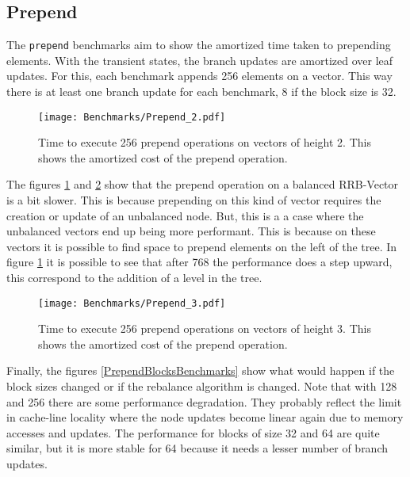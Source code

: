 \FloatBarrier

\subsection{Prepend}
The \texttt{prepend} benchmarks aim to show the amortized time taken to prepending elements. With the transient states, the branch updates are amortized over leaf updates. For this, each benchmark appends 256 elements on a vector. This way there is at least one branch update for each benchmark, 8 if the block size is 32.


\begin{figure}[h!]
  \centering
  \texttt{[image: Benchmarks/Prepend\_2.pdf]}
  \caption{Time to execute 256 prepend operations on vectors of height 2. This shows the amortized cost of the prepend operation.}
  \label{Prepend2Benchmarks}
\end{figure}

The figures \ref{Prepend2Benchmarks} and \ref{Prepend3Benchmarks} show that the prepend operation on a balanced RRB-Vector is a bit slower. This is because prepending on this kind of vector requires the creation or update of an unbalanced node. But, this is a a case where the unbalanced vectors end up being more performant. This is because on these vectors it is possible to find space to prepend elements on the left of the tree. In figure \ref{Prepend2Benchmarks} it is possible to see that after 768 the performance does a step upward, this correspond to the addition of a level in the tree.

\begin{figure}[h!]
  \centering
  \texttt{[image: Benchmarks/Prepend\_3.pdf]}
  \caption{Time to execute 256 prepend operations on vectors of height 3. This shows the amortized cost of the prepend operation.}
  \label{Prepend3Benchmarks}
\end{figure}

\FloatBarrier

Finally, the figures \ref{PrependBlocksBenchmarks} show what would happen if the block sizes changed or if the rebalance algorithm is changed. Note that with 128 and 256 there are some performance degradation. They probably reflect the limit in cache-line locality where the node updates become linear again due to memory accesses and updates. The performance for blocks of size 32 and 64 are quite similar, but it is more stable for 64 because it needs a lesser number of branch updates.

